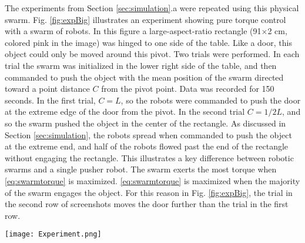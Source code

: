 The experiments from Section \ref{sec:simulation}.a were repeated using this physical swarm.
Fig. \ref{fig:expBig} illustrates an experiment showing pure torque control with a swarm of robots. In this figure a large-aspect-ratio rectangle  (91$\times$2 cm, colored pink in the image) was hinged to one side of the table.  Like a door, this object could only be moved around this pivot. 
Two trials were performed.  In each trial the swarm was initialized in the lower right side of the table, and then commanded to push the object with the mean position of the swarm directed toward a point distance $C$ from the pivot point. Data was recorded for 150 seconds.
In the first trial, $C = L$, so the robots were commanded to push the door at the extreme edge of the door from the pivot.  
In the second trial $C = 1/2 L$, and so the swarm pushed the object in the center of the rectangle.
As discussed in Section \ref{sec:simulation}, the robots spread when commanded to push the object at the extreme end, and half of the robots flowed past the end of the rectangle without engaging the rectangle.
 This illustrates a key difference between robotic swarms and a single pusher robot. The swarm exerts the most torque when  \eqref{eq:swarmtorque} is maximized.
  \eqref{eq:swarmtorque} is maximized when the majority of the swarm engages the object.
For this reason in Fig. \ref{fig:expBig}, the trial in the second row of screenshots moves the door further than the  trial in the  first row.
\begin{figure*}
\centering

\texttt{[image: Experiment.png]}
\vspace{-1em}
\caption{\label{fig:expBig}{Snapshots showing the effect of pushing a pivoted rectangular object at different distances from the pivot point. 
 97 robots were programmed to move toward the brightest light in the room, and   controlled by choosing which of 8 lights were on at any given instant. The top row of snapshots illustrate the swarm pushing at the end of the object.  In this case,  the swarm flows past the object and the force decreases. The bottom row illustrates that when the swarm pushes at the middle of the object the force provided by the swarm remains constant. In this case the swarm does not flow past the object. See video attachment for recordings of these experiments. }
}
\end{figure*}






